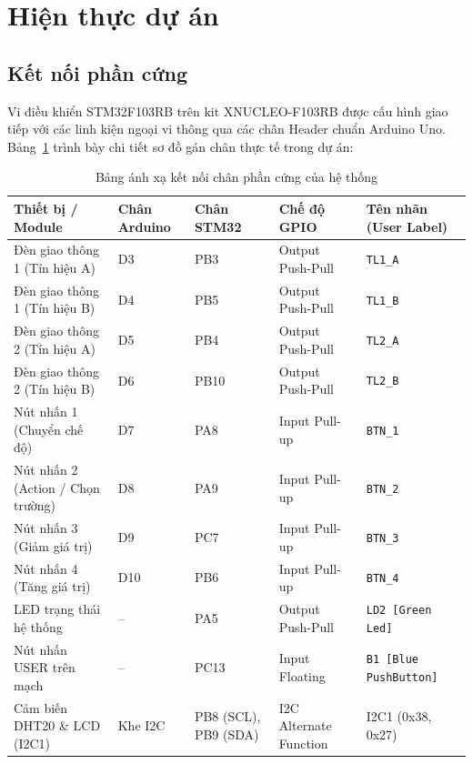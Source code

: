 \section{Hiện thực dự án}

\subsection{Kết nối phần cứng}
Vi điều khiển STM32F103RB trên kit XNUCLEO-F103RB được cấu hình giao tiếp với các linh kiện ngoại vi thông qua các chân Header chuẩn Arduino Uno. Bảng~\ref{tab:hardware_pinout} trình bày chi tiết sơ đồ gán chân thực tế trong dự án:

\begin{table}[!htbp]
\centering
\footnotesize
\setlength{\tabcolsep}{3.5pt}
\renewcommand{\arraystretch}{1.25}
\begin{tabularx}{\textwidth}{|>{\raggedright\arraybackslash}X|>{\centering\arraybackslash}p{1.4cm}|>{\centering\arraybackslash}p{1.9cm}|>{\raggedright\arraybackslash}p{2.5cm}|>{\raggedright\arraybackslash}p{2.7cm}|}
\hline
\textbf{Thiết bị / Module} & \textbf{Chân Arduino} & \textbf{Chân STM32} & \textbf{Chế độ GPIO} & \textbf{Tên nhãn (User Label)} \\ \hline
Đèn giao thông 1 (Tín hiệu A) & D3 & PB3 & Output Push-Pull & \texttt{TL1\_A} \\ \hline
Đèn giao thông 1 (Tín hiệu B) & D4 & PB5 & Output Push-Pull & \texttt{TL1\_B} \\ \hline
Đèn giao thông 2 (Tín hiệu A) & D5 & PB4 & Output Push-Pull & \texttt{TL2\_A} \\ \hline
Đèn giao thông 2 (Tín hiệu B) & D6 & PB10 & Output Push-Pull & \texttt{TL2\_B} \\ \hline
Nút nhấn 1 (Chuyển chế độ) & D7 & PA8 & Input Pull-up & \texttt{BTN\_1} \\ \hline
Nút nhấn 2 (Action / Chọn trường) & D8 & PA9 & Input Pull-up & \texttt{BTN\_2} \\ \hline
Nút nhấn 3 (Giảm giá trị) & D9 & PC7 & Input Pull-up & \texttt{BTN\_3} \\ \hline
Nút nhấn 4 (Tăng giá trị) & D10 & PB6 & Input Pull-up & \texttt{BTN\_4} \\ \hline
LED trạng thái hệ thống & -- & PA5 & Output Push-Pull & \texttt{LD2 [Green Led]} \\ \hline
Nút nhấn USER trên mạch & -- & PC13 & Input Floating & \texttt{B1 [Blue PushButton]} \\ \hline
Cảm biến DHT20 \& LCD (I2C1) & Khe I2C & PB8 (SCL), PB9 (SDA) & I2C Alternate Function & I2C1 (0x38, 0x27) \\ \hline
\end{tabularx}
\caption{Bảng ánh xạ kết nối chân phần cứng của hệ thống}
\label{tab:hardware_pinout}
\end{table}

